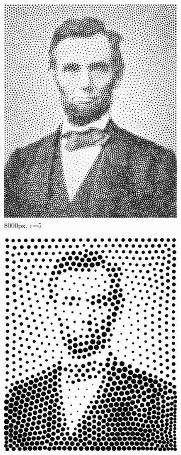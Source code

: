 \documentclass[11pt]{article}
\begin{document}
\begin{figure}[H]
\begin{subfigure}[b]{0.2\linewidth}
		\includegraphics[width=\linewidth]{pix/vr_AL_8000_r5.png}
		\caption{8000px, r=5}
	\end{subfigure}
	\begin{subfigure}[b]{0.2\linewidth}
		\includegraphics[width=\linewidth]{pix/vr_AL_1000_r10.png}

\end{subfigure}
\end{figure}
\end{document}
